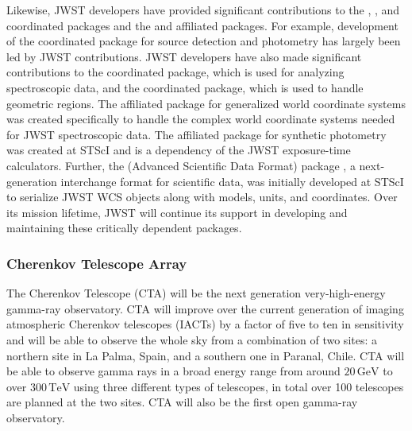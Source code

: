 \documentclass[modern]{aastex631}
\newcommand{\secauthor}[1]{{\color{blue}Author:~\textit{#1}}}
\newcommand{\secunfilled}{{\color{red}Author:~\textit{Looking for volunteers!}}}
\begin{document}
Likewise, JWST developers have provided significant contributions
to the  \citep{photutils}, 
\citep{specutils}, and  \citep{regions} coordinated
packages and the  \citep{gwcs} and 
\citep{synphot} affiliated packages. For example, development of the
 coordinated package for source detection and
photometry has largely been led by JWST contributions. JWST developers
have also made significant contributions to the 
coordinated package, which is used for analyzing spectroscopic data,
and the  coordinated package, which is used to
handle geometric regions. The  affiliated package for
generalized world coordinate systems was created specifically to handle
the complex world coordinate systems needed for JWST spectroscopic
data. The  affiliated package for synthetic photometry
was created at STScI and is a dependency of the JWST exposure-time
calculators. Further, the  (Advanced Scientific Data
Format) package \citep{ASDF}, a next-generation interchange format for
scientific data, was initially developed at STScI to serialize JWST WCS
objects along with \astropypkg models, units, and coordinates. Over
its mission lifetime, JWST will continue its support in developing and
maintaining these critically dependent packages.



\subsubsection{Cherenkov Telescope Array}

The Cherenkov Telescope (CTA) will be the next generation very-high-energy
gamma-ray observatory.
CTA will improve over the current generation of imaging atmospheric Cherenkov telescopes (IACTs)
by a factor of five to ten in sensitivity and will be able to observe the whole sky from a combination of two sites:
a northern site in La Palma, Spain, and a southern one in Paranal, Chile.
CTA will be able to observe gamma rays in a broad energy range from around $20\,\mathrm{GeV}$ to over $300\,\mathrm{TeV}$
using three different types of telescopes, in total over 100 telescopes are planned at the two sites.
CTA will also be the first open gamma-ray observatory.
\end{document}
